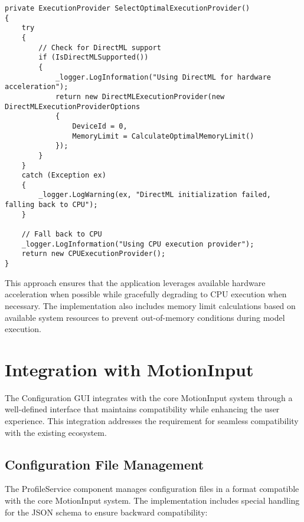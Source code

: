 \begin{verbatim}
private ExecutionProvider SelectOptimalExecutionProvider()
{
    try
    {
        // Check for DirectML support
        if (IsDirectMLSupported())
        {
            _logger.LogInformation("Using DirectML for hardware acceleration");
            return new DirectMLExecutionProvider(new DirectMLExecutionProviderOptions
            {
                DeviceId = 0,
                MemoryLimit = CalculateOptimalMemoryLimit()
            });
        }
    }
    catch (Exception ex)
    {
        _logger.LogWarning(ex, "DirectML initialization failed, falling back to CPU");
    }
    
    // Fall back to CPU
    _logger.LogInformation("Using CPU execution provider");
    return new CPUExecutionProvider();
}
\end{verbatim}

This approach ensures that the application leverages available hardware acceleration when possible while gracefully degrading to CPU execution when necessary. The implementation also includes memory limit calculations based on available system resources to prevent out-of-memory conditions during model execution.

\section{Integration with MotionInput}
The Configuration GUI integrates with the core MotionInput system through a well-defined interface that maintains compatibility while enhancing the user experience. This integration addresses the requirement for seamless compatibility with the existing ecosystem.

\subsection{Configuration File Management}
The ProfileService component manages configuration files in a format compatible with the core MotionInput system. The implementation includes special handling for the JSON schema to ensure backward compatibility:

